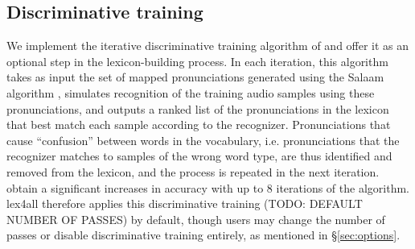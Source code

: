 \documentclass[11pt]{article}
\begin{document}
%
%



\subsection{Discriminative training}
\label{sec:discrimtrain}
We implement the iterative discriminative training algorithm of  and offer it as an optional step in the lexicon-building process. In each iteration, this algorithm takes as input the set of mapped pronunciations generated using the Salaam algorithm \cite{Qiao10}, simulates recognition of the training audio samples using these pronunciations, and outputs a ranked list of the pronunciations in the lexicon that best match each sample according to the recognizer. Pronunciations that cause ``confusion'' between words in the vocabulary, i.e. pronunciations that the recognizer matches to samples of the wrong word type, are thus identified and removed from the lexicon, and the process is repeated in the next iteration.  obtain a significant increases in accuracy with up to 8 iterations of the algorithm. lex4all therefore applies this discriminative training (TODO: DEFAULT NUMBER OF PASSES) by default, though users may change the number of passes or disable discriminative training entirely, as mentioned in \S\ref{sec:options}.
\end{document}
